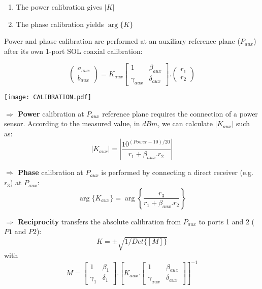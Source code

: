 \documentclass[a0paper,portrait]{baposter}
\begin{document}
\begin{poster}
{\begin{enumerate}
\item The power calibration gives $|K|$
\item The phase calibration yields $\arg\{K\}$
\end{enumerate}

Power and phase calibration are performed at an auxiliary reference plane ($P_{aux}$) after its own 1-port SOL coaxial calibration:

\begin{equation*}
\begin{pmatrix} a_{aux} \\  b_{aux} \end{pmatrix}=K_{aux}\begin{bmatrix} 1 & \beta_{aux} \\  \gamma_{aux} &  \delta_{aux} \end{bmatrix}.\begin{pmatrix} r_1 \\  r_2  \end{pmatrix}
\label{eq:cal_port_aux}
\end{equation*}

\begin{center}
\texttt{[image: CALIBRATION.pdf]}
\end{center}

\textbf{$\Rightarrow$ Power} calibration at $P_{aux}$ reference plane requires the connection of a power sensor. According to the measured value, in $dBm$, we can calculate $|K_{aux}|$ such as:
\begin{equation*}
|K_{aux}|=\left|{\frac{10^{(Power-10)/20}}{ r_1 + \beta_{aux} . r_2}}\right|
\label{eq:cal_power}
\end{equation*}

\textbf{$\Rightarrow$ Phase} calibration at $P_{aux}$ is performed by connecting a direct receiver (e.g. $r_3$) at $P_{aux}$:
\begin{equation*}
\arg\{K_{aux}\}=\arg\left\{{\frac{r_3}{ r_1 + \beta_{aux} . r_2}}\right\}
\label{eq:cal_phase}
\end{equation*}

\textbf{$\Rightarrow$ Reciprocity} transfers the absolute calibration from $P_{aux}$ to ports 1 and 2 ($P1$ and $P2$):
\begin{equation*}
K=\pm\sqrt{1/Det\{[M]\}}
\label{eq:reciprocity_1}
\end{equation*}
with
\begin{equation*}
M=\begin{bmatrix} 1 & \beta_1  \\  \gamma_1 &  \delta_1 \end{bmatrix}. {\left [ K_{aux}.\begin{bmatrix} 1 & \beta_{aux}  \\  \gamma_{aux} &  \delta_{aux}  \end{bmatrix} \right]}^{-1} 
\label{eq:reciprocity_2}
\end{equation*}
}



\end{poster}
\end{document}
